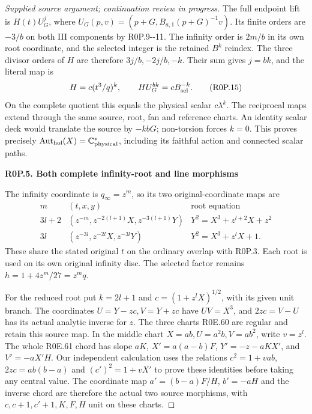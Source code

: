 \begin{proof}[Supplied source argument; continuation review in progress]
The full endpoint lift is \(H(t)U_G^j\), where
\(U_G(p,v)=(p+G,B_{a,1}(p+G)^{-1}v)\). Its finite orders
are \(-3/b\) on both III components by R0P.9-\/-11. The
infinity order is \(2m/b\) in its own root coordinate, and
the selected integer is the retained \(B^k\) reindex. The
three divisor orders of \(H\) are therefore
\(3j/b,-2j/b,-k\). Their sum gives \(j=bk\), and the
literal map is
\[
 H=c(t^3/q)^k,\qquad H U_G^{bk}=c B_{\rm sel}^{-k}.
 \tag{R0P.15}
\]
On the complete quotient this equals the physical scalar
\(c\lambda^k\). The reciprocal maps extend through the same
source, root, fan and reference charts. An identity scalar
deck would translate the source by \(-kbG\); non-torsion
forces \(k=0\). This proves precisely
\(\operatorname{Aut}_{\rm hol}(X)=\mathbb C^*_{\rm physical}\),
including its faithful action and connected scalar paths.

\par

\medskip\noindent\textbf{R0P.5. Both complete infinity-root and line morphisms}

\par\nobreak

The infinity coordinate is \(q_\infty=z^m\), so its two
original-coordinate maps are
\[
 \begin{array}{c|c|c}
 m&(t,x,y)&\text{root equation}\\\hline
 3l+2&(z^{-m},z^{-2(l+1)}X,z^{-3(l+1)}Y)
   &Y^2=X^3+z^{l+2}X+z^2\\
 3l&(z^{-3l},z^{-2l}X,z^{-3l}Y)
   &Y^2=X^3+z^lX+1.
 \end{array}
 \tag{R0P.16}
\]
These share the stated original \(t\) on the ordinary overlap
with R0P.3. Each root is used on its own original infinity
disc. The selected factor remains
\(h=1+4z^m/27=z^mq\).

For the reduced root put \(k=2l+1\) and
\(c=(1+z^lX)^{1/2}\), with its given unit branch. The
coordinates \(U=Y-zc,V=Y+zc\) have \(UV=X^3\), and
\(2zc=V-U\) has its actual analytic inverse for \(z\).
The three charts R0E.60 are regular and retain this source
map. In the middle chart \(X=ab,U=a^2b,V=ab^2\), write
\(v=z^l\). The whole R0E.61 chord has slope \(aK\),
\(X'=a(a-b)F\), \(Y'=-z-aKX'\), and
\(V'=-aX'H\). Our independent calculation uses the
relations \(c^2=1+vab\), \(2zc=ab(b-a)\) and
\((c')^2=1+vX'\) to prove these identities before taking
any central value. The coordinate map
\(a'=(b-a)F/H\), \(b'=-aH\) and the inverse chord
are therefore the actual two source morphisms, with
\(c,c+1,c'+1,K,F,H\) unit on these charts.


\end{proof}
